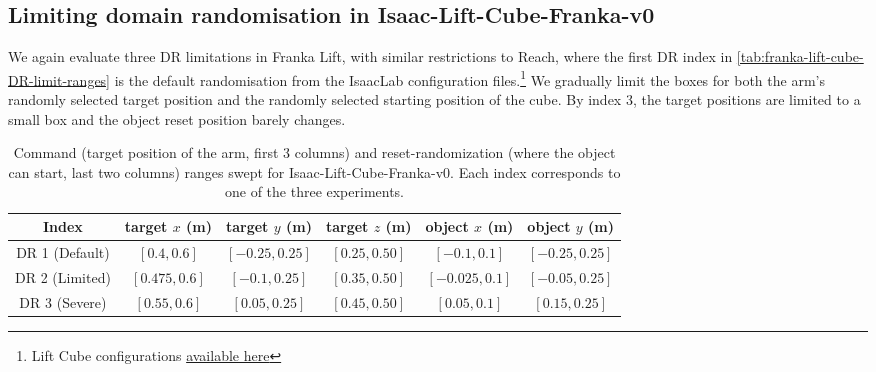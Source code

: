 \documentclass{article} %
\begin{document}
    \subsection{Limiting domain randomisation in Isaac-Lift-Cube-Franka-v0}


        We again evaluate three DR limitations in Franka Lift, with similar restrictions to Reach, where the first DR index in \autoref{tab:franka-lift-cube-DR-limit-ranges} is the default randomisation from the IsaacLab configuration files.\footnote{Lift Cube configurations \href{https://github.com/isaac-sim/IsaacLab/blob/main/source/isaaclab_tasks/isaaclab_tasks/manager_based/manipulation/lift/lift_env_cfg.py}{available here}} We gradually limit the boxes for both the arm's randomly selected target position and the randomly selected starting position of the cube. By index 3, the target positions are limited to a small box and the object reset position barely changes.

        \begin{table}[h]
            \centering
            \caption{Command (target position of the arm, first 3 columns) and reset-randomization (where the object can start, last two columns) ranges swept for Isaac-Lift-Cube-Franka-v0. Each index corresponds to one of the three experiments.}
            \label{tab:franka-lift-cube-DR-limit-ranges}
            \begin{tabular}{c cccc c}
            \toprule
            Index & target $x$ (m) & target $y$ (m) & target $z$ (m) & object $x$ (m) & object $y$ (m) \\
            \midrule
            DR 1 (Default) & $[0.4, 0.6]$ & $[-0.25, 0.25]$ & $[0.25, 0.50]$ & $[-0.1, 0.1]$ & $[-0.25, 0.25]$ \\
            DR 2 (Limited) & $[0.475, 0.6]$ & $[-0.1, 0.25]$ & $[0.35, 0.50]$ & $[-0.025, 0.1]$ & $[-0.05, 0.25]$ \\
            DR 3 (Severe) & $[0.55, 0.6]$ & $[0.05, 0.25]$ & $[0.45, 0.50]$ & $[0.05, 0.1]$ & $[0.15, 0.25]$ \\
            \bottomrule
            \end{tabular}
        \end{table}
\end{document}
